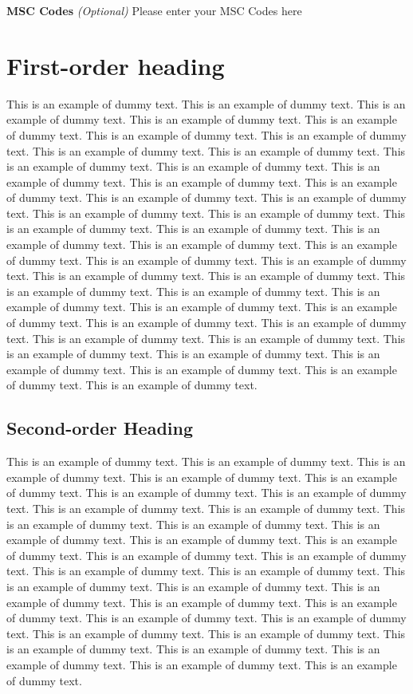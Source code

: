 \documentclass[lineno]{jfm}
\begin{document}
{\bf MSC Codes }  {\it(Optional)} Please enter your MSC Codes here

\section{First-order heading}
\label{sec:headings}

 This is an example of dummy text. This is an example of dummy text. This is an example of dummy text. This is an example of dummy text. This is an example of dummy text. This is an example of dummy text. This is an example of dummy text. This is an example of dummy text. This is an example of dummy text. This is an example of dummy text. This is an example of dummy text. This is an example of dummy text. This is an example of dummy text. This is an example of dummy text. This is an example of dummy text. This is an example of dummy text. This is an example of dummy text. This is an example of dummy text. This is an example of dummy text. This is an example of dummy text. This is an example of dummy text. This is an example of dummy text. This is an example of dummy text. This is an example of dummy text. This is an example of dummy text. This is an example of dummy text. This is an example of dummy text. This is an example of dummy text. This is an example of dummy text. This is an example of dummy text. This is an example of dummy text. This is an example of dummy text. This is an example of dummy text. This is an example of dummy text. This is an example of dummy text. This is an example of dummy text. This is an example of dummy text. This is an example of dummy text. This is an example of dummy text. This is an example of dummy text. This is an example of dummy text. This is an example of dummy text. 

\subsection {Second-order Heading}
 This is an example of dummy text. This is an example of dummy text. This is an example of dummy text. This is an example of dummy text. This is an example of dummy text. This is an example of dummy text. This is an example of dummy text. This is an example of dummy text. This is an example of dummy text. This is an example of dummy text. This is an example of dummy text. This is an example of dummy text.  This is an example of dummy text. This is an example of dummy text. This is an example of dummy text. This is an example of dummy text. This is an example of dummy text. This is an example of dummy text. This is an example of dummy text. This is an example of dummy text. This is an example of dummy text. This is an example of dummy text. This is an example of dummy text. This is an example of dummy text. This is an example of dummy text. This is an example of dummy text. This is an example of dummy text. This is an example of dummy text. This is an example of dummy text. This is an example of dummy text. This is an example of dummy text. This is an example of dummy text. 
\end{document}
